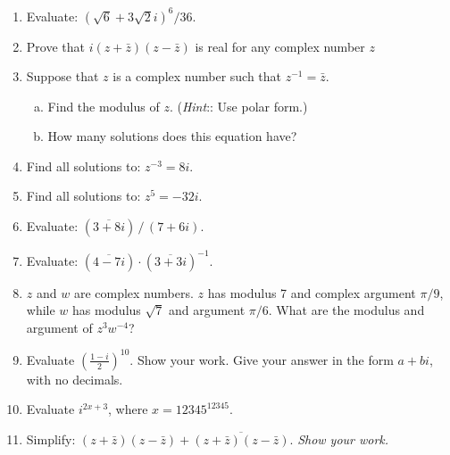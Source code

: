 \begin{enumerate}

\item
Evaluate: $(\sqrt{6}+3\sqrt{2}i)^6/36$.

\item
Prove that  $i(z + \bar{z})(z - \bar{z})$ is real for any complex number $z$

\item
Suppose that $z$ is a complex number such that $z^{-1} = \bar{z}$.
\begin{enumerate}[(a)]
\item
 Find the modulus of $z$. (\emph{Hint}:: Use polar form.)
\item
How many solutions does this equation have?
\end{enumerate}
	
\item
Find all solutions to:  $\displaystyle{z^{-3} = 8i.}$

\item
Find all solutions to:  $z^5 = -32i.$


\item
Evaluate:  $\displaystyle{ \left(\overline{3 + 8i} \right)  \, / \, \left(7 + 6i \right)}$.
\item
Evaluate:  $\displaystyle{( \overline{4 -7i} ) \cdot (\overline{3 + 3i})^{-1}}$.
\item
$z$ and $w$ are complex numbers. $z$ has modulus 7 and complex argument $\pi/9$, while $w$ has modulus $\sqrt{7}$ and argument $\pi/6$.  What are the modulus and argument of $z^3 w^{-4}$?

\item
Evaluate $\left(\frac{1-i}{2}\right)^{10}$.  Show your work. Give your answer in the form $a + bi$, with no decimals.

\item
Evaluate $ i^{2x+3}$, where $x=12345^{12345}$.


\item
Simplify:  $(z + \bar{z})(z - \bar{z}) + \overline{(z + \bar{z})(z - \bar{z})}$. \emph{Show your work.}


\end{enumerate}
